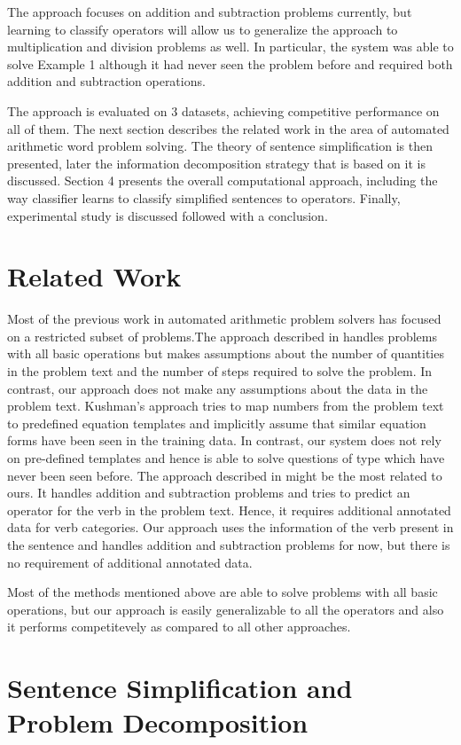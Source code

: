 \documentclass[11pt]{article}
\begin{document}
The approach focuses on addition and subtraction problems currently, but learning to classify operators will allow us to generalize the approach to multiplication and division problems as well. In particular, the system was able to solve Example 1 although it had never seen the problem before and required both addition and subtraction operations.

The approach is evaluated on 3 datasets, achieving competitive performance on all of them. The next section describes the related work in the area of automated arithmetic word problem solving. The theory of sentence simplification is then presented, later the information decomposition strategy that is based on it is discussed. Section 4 presents the overall computational approach, including the way classifier learns to classify simplified sentences to operators. Finally, experimental study is discussed followed with a conclusion.

\section{Related Work}
Most of the previous work in automated arithmetic problem solvers has focused on a restricted subset of problems.The approach described in \citep{RoyTACL15} handles problems with all basic operations but makes assumptions about the number of quantities in the problem text and the number of steps required to solve the problem. In contrast, our approach does not make any assumptions about the data in the problem text. Kushman's approach \citep{Kushman} tries to map numbers from the problem text to predefined equation templates and implicitly assume that similar equation forms have been seen in the training data. In contrast, our system does not rely on pre-defined templates and hence is able to solve questions of type which have never been seen before.  The approach described in \citep{ARIS} might be the most related to ours. It handles addition and subtraction problems and tries to predict an operator for the verb in the problem text. Hence, it requires additional annotated data for verb categories. Our approach uses the information of the verb present in the sentence and handles addition and subtraction problems for now, but there is no requirement of additional annotated data. 

Most of the methods mentioned above are able to solve problems with all basic operations, but our approach is easily generalizable to all the operators and also it performs competitevely as compared to all other approaches. 

\section{Sentence Simplification and Problem Decomposition}

\newpage


\end{document}
